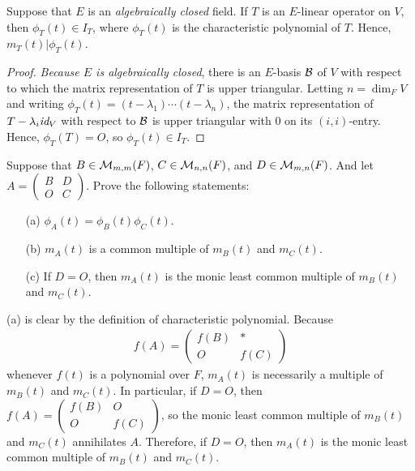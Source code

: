 \begin{prop}
    Suppose that $E$ is an \textit{algebraically closed} field.
    If $T$ is an $E$-linear operator on $V$, then $\phi_T(t)\in I_T$, where $\phi_T(t)$ is the characteristic polynomial of $T$.
    Hence, $m_T(t)|\phi_T(t)$.
\end{prop}
\begin{proof}
    \textit{Because $E$ is algebraically closed}, there is an $E$-basis ${\mathcal{B}}$ of $V$ with respect to which the matrix representation of $T$ is upper triangular.
    Letting $n=\dim_F V$ and writing $\phi_T(t)=(t-\lambda_1)\cdots(t-\lambda_n)$, the matrix representation of $T-\lambda_i\textit{id}_{V}$ with respect to ${\mathcal{B}}$ is upper triangular with 0 on its $(i, i)$-entry.
    Hence, $\phi_T(T)=O$, so $\phi_T(t)\in I_T$.
\end{proof}

\begin{prob}
    Suppose that $B\in{\mathcal{M}}_{m, m}(F)$, $C\in{\mathcal{M}}_{n, n}(F)$, and $D\in{\mathcal{M}}_{m, n}(F)$.
    And let $A=\left(\begin{array}{c|c}
        B&D\\   \hline
        O&C
    \end{array}\right)$.
    Prove the following statements:
    \begin{enumerate}
        \item[(a)]
        {
            $\phi_A(t)=\phi_B(t)\phi_C(t)$.
        }
        \item[(b)]
        {
            $m_A(t)$ is a common multiple of $m_B(t)$ and $m_C(t)$.
        }
        \item[(c)]
        {
            If $D=O$, then $m_A(t)$ is the monic least common multiple of $m_B(t)$ and $m_C(t)$.
        }
    \end{enumerate}
\end{prob}
\begin{sol}
    (a) is clear by the definition of characteristic polynomial.
    Because
    \begin{align*}
        f(A)=\begin{pmatrix}
            f(B)&\ast\\O&f(C)
        \end{pmatrix}    
    \end{align*}
    whenever $f(t)$ is a polynomial over $F$, $m_A(t)$ is necessarily a multiple of $m_B(t)$ and $m_C(t)$.
    In particular, if $D=O$, then $f(A)=\begin{pmatrix}
        f(B)&O\\O&f(C)
    \end{pmatrix}$, so the monic least common multiple of $m_B(t)$ and $m_C(t)$ annihilates $A$.
    Therefore, if $D=O$, then $m_A(t)$ is the monic least common multiple of $m_B(t)$ and $m_C(t)$.
\end{sol}

